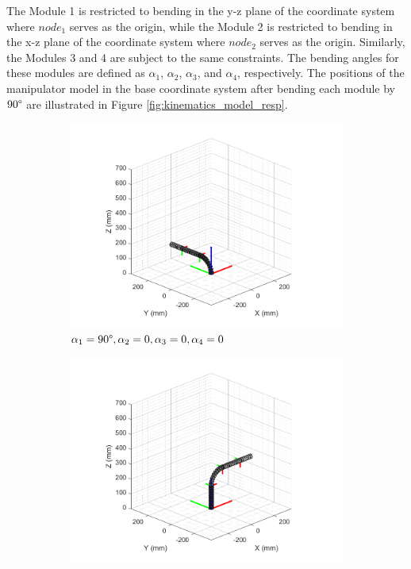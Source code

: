 \noindent The Module 1 is restricted to bending in the y-z plane of the coordinate system where $node_1$ serves as 
the origin, while the Module 2 is restricted to bending in the x-z plane of the coordinate system where $node_2$ 
serves as the origin. Similarly, the Modules 3 and 4 are subject to the same constraints. The bending angles for 
these modules are defined as $\alpha_1$, $\alpha_2$, $\alpha_3$, and $\alpha_4$, respectively. The positions of the 
manipulator model in the base coordinate system after bending each module by $90 \degree$ are illustrated in Figure 
\ref{fig:kinematics_model_resp}.
\begin{figure}[H] %
    \centering %
    \captionsetup{labelsep=colon}
    \begin{subfigure}{0.48\textwidth} %
        \centering
        \includegraphics[width=\linewidth]{Image/MATLAB/manipulator_90_0_0_0.png}
        \caption{$\alpha_1=90 \degree,\alpha_2=0,\alpha_3=0,\alpha_4=0$}
    \end{subfigure}
    \hfill
    \begin{subfigure}{0.48\textwidth} %
        \centering
        \includegraphics[width=\linewidth]{Image/MATLAB/manipulator_0_90_0_0.png}

\end{subfigure}
\end{figure}
